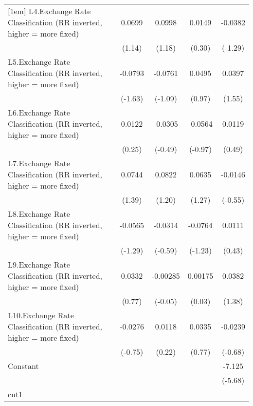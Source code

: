 {\begin{longtable}{l*{4}{c}}
[1em]
L4.Exchange Rate Classification (RR inverted, higher = more fixed)&   0.0699         &   0.0998         &   0.0149         &  -0.0382         \\
                &   (1.14)         &   (1.18)         &   (0.30)         &  (-1.29)         \\
[1em]
L5.Exchange Rate Classification (RR inverted, higher = more fixed)&  -0.0793         &  -0.0761         &   0.0495         &   0.0397         \\
                &  (-1.63)         &  (-1.09)         &   (0.97)         &   (1.55)         \\
[1em]
L6.Exchange Rate Classification (RR inverted, higher = more fixed)&   0.0122         &  -0.0305         &  -0.0564         &   0.0119         \\
                &   (0.25)         &  (-0.49)         &  (-0.97)         &   (0.49)         \\
[1em]
L7.Exchange Rate Classification (RR inverted, higher = more fixed)&   0.0744         &   0.0822         &   0.0635         &  -0.0146         \\
                &   (1.39)         &   (1.20)         &   (1.27)         &  (-0.55)         \\
[1em]
L8.Exchange Rate Classification (RR inverted, higher = more fixed)&  -0.0565         &  -0.0314         &  -0.0764         &   0.0111         \\
                &  (-1.29)         &  (-0.59)         &  (-1.23)         &   (0.43)         \\
[1em]
L9.Exchange Rate Classification (RR inverted, higher = more fixed)&   0.0332         & -0.00285         &  0.00175         &   0.0382         \\
                &   (0.77)         &  (-0.05)         &   (0.03)         &   (1.38)         \\
[1em]
L10.Exchange Rate Classification (RR inverted, higher = more fixed)&  -0.0276         &   0.0118         &   0.0335         &  -0.0239         \\
                &  (-0.75)         &   (0.22)         &   (0.77)         &  (-0.68)         \\
[1em]
Constant        &                  &                  &                  &   -7.125\sym{***}\\
                &                  &                  &                  &  (-5.68)         \\
\hline
cut1            &                  &                  &                  &                  \\

\end{longtable}}
